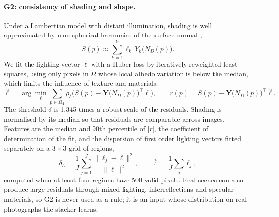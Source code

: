 \documentclass[11pt,a4paper]{article}
\begin{document}
\paragraph{G2: consistency of shading and shape.} Under a Lambertian model with distant illumination, shading is well approximated by nine spherical harmonics of the surface normal \citep{ramamoorthi2001efficient},
\begin{equation}
S(p) \approx \sum_{k=1}^{9} \ell_k\, Y_k\big(N_D(p)\big).
\label{eq:sh}
\end{equation}
We fit the lighting vector $\boldsymbol\ell$ with a Huber loss \citep{huber1964robust} by iteratively reweighted least squares, using only pixels in $\Omega$ whose local albedo variation is below the median, which limits the influence of texture and materials:
\begin{equation}
\hat{\boldsymbol\ell} = \arg\min_{\boldsymbol\ell} \sum_{p \in \Omega_A} \rho_{\delta}\Big(S(p) - \mathbf{Y}\big(N_D(p)\big)^{\top}\boldsymbol\ell\Big), \qquad r(p) = S(p) - \mathbf{Y}\big(N_D(p)\big)^{\top}\hat{\boldsymbol\ell}.
\label{eq:huber}
\end{equation}
The threshold $\delta$ is 1.345 times a robust scale of the residuals. Shading is normalised by its median so that residuals are comparable across images. Features are the median and 90th percentile of $|r|$, the coefficient of determination of the fit, and the dispersion of first order lighting vectors fitted separately on a $3\times 3$ grid of regions,
\begin{equation}
\delta_L = \frac{1}{J}\sum_{j=1}^{J} \frac{\lVert \boldsymbol\ell_j - \bar{\boldsymbol\ell}\rVert^2}{\lVert \bar{\boldsymbol\ell}\rVert^2}, \qquad \bar{\boldsymbol\ell} = \frac{1}{J}\sum_{j} \boldsymbol\ell_j ,
\label{eq:dispersion}
\end{equation}
computed when at least four regions have 500 valid pixels. Real scenes can also produce large residuals through mixed lighting, interreflections and specular materials, so G2 is never used as a rule; it is an input whose distribution on real photographs the stacker learns.
\end{document}
